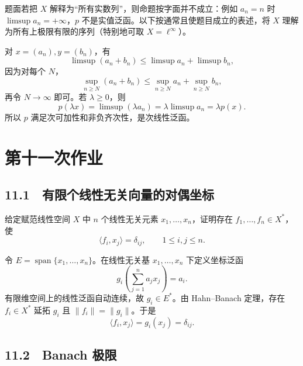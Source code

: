 题面若把 $X$ 解释为“所有实数列”，则命题按字面并不成立：例如 $a_n=n$ 时
$\limsup a_n=+\infty$，$p$ 不是实值泛函。以下按通常且使题目成立的表述，将
$X$ 理解为所有上极限有限的序列（特别地可取 $X=\ell^\infty$）。

对 $x=(a_n),y=(b_n)$，有
\[
 \limsup(a_n+b_n)\le\limsup a_n+\limsup b_n,
\]
因为对每个 $N$，
\[
 \sup_{n\ge N}(a_n+b_n)
 \le\sup_{n\ge N}a_n+\sup_{n\ge N}b_n,
\]
再令 $N\to\infty$ 即可。若 $\lambda\ge0$，则
\[
 p(\lambda x)=\limsup(\lambda a_n)=\lambda\limsup a_n=\lambda p(x).
\]
所以 $p$ 满足次可加性和非负齐次性，是次线性泛函。

\section{第十一次作业}

\subsection*{11.1　有限个线性无关向量的对偶坐标}

\begin{problem}
给定赋范线性空间 $X$ 中 $n$ 个线性无关元素 $x_1,\dots,x_n$，证明存在
$f_1,\dots,f_n\in X^*$，使
\[
 \langle f_i,x_j\rangle=\delta_{ij},\qquad 1\le i,j\le n.
\]
\end{problem}

令 $E=\operatorname{span}\{x_1,\dots,x_n\}$。在线性无关基
$x_1,\dots,x_n$ 下定义坐标泛函
\[
 g_i\!\left(\sum_{j=1}^na_jx_j\right)=a_i.
\]
有限维空间上的线性泛函自动连续，故 $g_i\in E^*$。由 Hahn--Banach 定理，存在
$f_i\in X^*$ 延拓 $g_i$ 且 $\|f_i\|=\|g_i\|$。于是
\[
 \langle f_i,x_j\rangle=g_i(x_j)=\delta_{ij}.
\]

\subsection*{11.2　Banach 极限}

